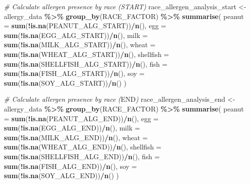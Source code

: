 \documentclass[
]{article}
\newenvironment{Shaded}{\begin{snugshade}}{\end{snugshade}}
\newcommand{\AttributeTok}[1]{\textcolor[rgb]{0.13,0.29,0.53}{#1}}
\newcommand{\CommentTok}[1]{\textcolor[rgb]{0.56,0.35,0.01}{\textit{#1}}}
\newcommand{\FunctionTok}[1]{\textcolor[rgb]{0.13,0.29,0.53}{\textbf{#1}}}
\newcommand{\NormalTok}[1]{#1}
\newcommand{\OtherTok}[1]{\textcolor[rgb]{0.56,0.35,0.01}{#1}}
\newcommand{\RegionMarkerTok}[1]{#1}
\newcommand{\SpecialCharTok}[1]{\textcolor[rgb]{0.81,0.36,0.00}{\textbf{#1}}}
\begin{document}
\begin{Shaded}
\begin{Highlighting}[]
\CommentTok{\# Calculate allergen presence by race (START)}
\NormalTok{race\_allergen\_analysis\_start }\OtherTok{\textless{}{-}}\NormalTok{ allergy\_data }\SpecialCharTok{\%\textgreater{}\%}
  \FunctionTok{group\_by}\NormalTok{(RACE\_FACTOR) }\SpecialCharTok{\%\textgreater{}\%}
  \FunctionTok{summarise}\NormalTok{(}
    \AttributeTok{peanut =} \FunctionTok{sum}\NormalTok{(}\SpecialCharTok{!}\FunctionTok{is.na}\NormalTok{(PEANUT\_ALG\_START))}\SpecialCharTok{/}\FunctionTok{n}\NormalTok{(),}
    \AttributeTok{egg =} \FunctionTok{sum}\NormalTok{(}\SpecialCharTok{!}\FunctionTok{is.na}\NormalTok{(EGG\_ALG\_START))}\SpecialCharTok{/}\FunctionTok{n}\NormalTok{(),}
    \AttributeTok{milk =} \FunctionTok{sum}\NormalTok{(}\SpecialCharTok{!}\FunctionTok{is.na}\NormalTok{(MILK\_ALG\_START))}\SpecialCharTok{/}\FunctionTok{n}\NormalTok{(),}
    \AttributeTok{wheat =} \FunctionTok{sum}\NormalTok{(}\SpecialCharTok{!}\FunctionTok{is.na}\NormalTok{(WHEAT\_ALG\_START))}\SpecialCharTok{/}\FunctionTok{n}\NormalTok{(),}
    \AttributeTok{shellfish =} \FunctionTok{sum}\NormalTok{(}\SpecialCharTok{!}\FunctionTok{is.na}\NormalTok{(SHELLFISH\_ALG\_START))}\SpecialCharTok{/}\FunctionTok{n}\NormalTok{(),}
    \AttributeTok{fish =} \FunctionTok{sum}\NormalTok{(}\SpecialCharTok{!}\FunctionTok{is.na}\NormalTok{(FISH\_ALG\_START))}\SpecialCharTok{/}\FunctionTok{n}\NormalTok{(),}
    \AttributeTok{soy =} \FunctionTok{sum}\NormalTok{(}\SpecialCharTok{!}\FunctionTok{is.na}\NormalTok{(SOY\_ALG\_START))}\SpecialCharTok{/}\FunctionTok{n}\NormalTok{()}
\NormalTok{  )}

\CommentTok{\# Calculate allergen presence by race (}\RegionMarkerTok{END}\CommentTok{)}
\NormalTok{race\_allergen\_analysis\_end }\OtherTok{\textless{}{-}}\NormalTok{ allergy\_data }\SpecialCharTok{\%\textgreater{}\%}
  \FunctionTok{group\_by}\NormalTok{(RACE\_FACTOR) }\SpecialCharTok{\%\textgreater{}\%}
  \FunctionTok{summarise}\NormalTok{(}
    \AttributeTok{peanut =} \FunctionTok{sum}\NormalTok{(}\SpecialCharTok{!}\FunctionTok{is.na}\NormalTok{(PEANUT\_ALG\_END))}\SpecialCharTok{/}\FunctionTok{n}\NormalTok{(),}
    \AttributeTok{egg =} \FunctionTok{sum}\NormalTok{(}\SpecialCharTok{!}\FunctionTok{is.na}\NormalTok{(EGG\_ALG\_END))}\SpecialCharTok{/}\FunctionTok{n}\NormalTok{(),}
    \AttributeTok{milk =} \FunctionTok{sum}\NormalTok{(}\SpecialCharTok{!}\FunctionTok{is.na}\NormalTok{(MILK\_ALG\_END))}\SpecialCharTok{/}\FunctionTok{n}\NormalTok{(),}
    \AttributeTok{wheat =} \FunctionTok{sum}\NormalTok{(}\SpecialCharTok{!}\FunctionTok{is.na}\NormalTok{(WHEAT\_ALG\_END))}\SpecialCharTok{/}\FunctionTok{n}\NormalTok{(),}
    \AttributeTok{shellfish =} \FunctionTok{sum}\NormalTok{(}\SpecialCharTok{!}\FunctionTok{is.na}\NormalTok{(SHELLFISH\_ALG\_END))}\SpecialCharTok{/}\FunctionTok{n}\NormalTok{(),}
    \AttributeTok{fish =} \FunctionTok{sum}\NormalTok{(}\SpecialCharTok{!}\FunctionTok{is.na}\NormalTok{(FISH\_ALG\_END))}\SpecialCharTok{/}\FunctionTok{n}\NormalTok{(),}
    \AttributeTok{soy =} \FunctionTok{sum}\NormalTok{(}\SpecialCharTok{!}\FunctionTok{is.na}\NormalTok{(SOY\_ALG\_END))}\SpecialCharTok{/}\FunctionTok{n}\NormalTok{()}
\NormalTok{  )}


\end{Highlighting}
\end{Shaded}
\end{document}
